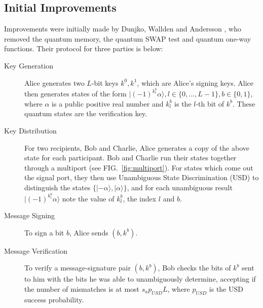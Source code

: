 \documentclass[%
 reprint,
 amsmath,amssymb,
 aps,
 pra,
]{revtex4-1}
\begin{document}
\subsection{Initial Improvements}
\label{ssec:no-qmem}

Improvements were initially made by Dunjko, Wallden and Andersson \cite{PhysRevLett.112.040502}, who removed the quantum memory, the quantum SWAP test and quantum one-way functions. Their protocol for three parties is below:

\begin{description}
\item[Key Generation]Alice generates two $L$-bit keys $k^0, k^1$, which are Alice's signing keys. Alice then generates states of the form $|(-1)^{k^b_l}\alpha\rangle, l \in \{0,...,L-1\}, b \in \{0, 1\}$, where $\alpha$ is a public  positive real number and $k^b_l$ is the $l$-th bit of $k^b$. These quantum states are the verification key.
\item[Key Distribution]For two recipients, Bob and Charlie, Alice generates a copy of the above state for each participant. Bob and Charlie run their states together through a multiport (see FIG.\ \ref{fig:multiport}). For states which come out the signal port, they then use Unambiguous State Discrimination (USD) \cite{Ivanovic1987257} to distinguish the states $\{|-\alpha\rangle, |\alpha\rangle\}$, and for each unambiguous result $|(-1)^{k^b_l}\alpha\rangle$ note the value of $k^b_l$, the index $l$ and $b$.
\item[Message Signing]To sign a bit $b$, Alice sends $(b, k^b)$.
\item[Message Verification]To verify a message-signature pair $(b, k^b)$, Bob checks the bits of $k^b$ sent to him with the bits he was able to unambiguously determine, accepting if the number of mismatches is at most $s_ap_{USD}L$, where $p_{USD}$ is the USD success probability.
\end{description}
\end{document}
